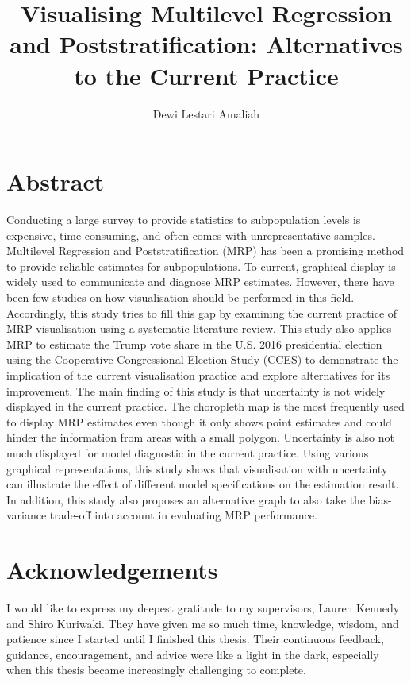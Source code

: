 \documentclass{monashthesis}
\author{Dewi Lestari Amaliah}
\title{Visualising Multilevel Regression and Poststratification: Alternatives to the Current Practice}
\begin{document}

\titlepage

{\sf\tighttoc\doublespacing}

\clearpage{}\setcounter{page}{0}

\hypertarget{abstract}{%
\chapter*{Abstract}\label{abstract}}

Conducting a large survey to provide statistics to subpopulation levels is expensive, time-consuming, and often comes with unrepresentative samples. Multilevel Regression and Poststratification (MRP) has been a promising method to provide reliable estimates for subpopulations. To current, graphical display is widely used to communicate and diagnose MRP estimates. However, there have been few studies on how visualisation should be performed in this field. Accordingly, this study tries to fill this gap by examining the current practice of MRP visualisation using a systematic literature review. This study also applies MRP to estimate the Trump vote share in the U.S. 2016 presidential election using the Cooperative Congressional Election Study (CCES) to demonstrate the implication of the current visualisation practice and explore alternatives for its improvement. The main finding of this study is that uncertainty is not widely displayed in the current practice. The choropleth map is the most frequently used to display MRP estimates even though it only shows point estimates and could hinder the information from areas with a small polygon. Uncertainty is also not much displayed for model diagnostic in the current practice. Using various graphical representations, this study shows that visualisation with uncertainty can illustrate the effect of different model specifications on the estimation result. In addition, this study also proposes an alternative graph to also take the bias-variance trade-off into account in evaluating MRP performance.

\newpage

\hypertarget{acknowledgements}{%
\chapter*{Acknowledgements}\label{acknowledgements}}

I would like to express my deepest gratitude to my supervisors, Lauren Kennedy and Shiro Kuriwaki. They have given me so much time, knowledge, wisdom, and patience since I started until I finished this thesis. Their continuous feedback, guidance, encouragement, and advice were like a light in the dark, especially when this thesis became increasingly challenging to complete.
\end{document}
